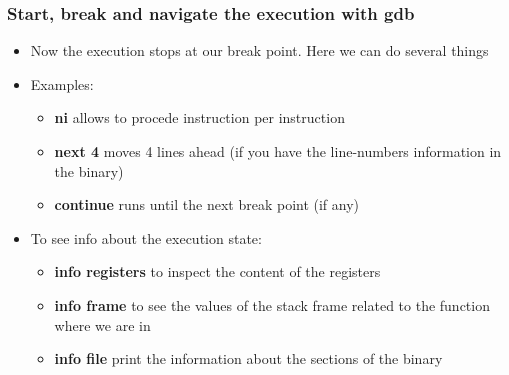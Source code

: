 \documentclass[]{beamer}
\begin{document}
\begin{frame}
  \frametitle{Start, break and navigate the execution with gdb}
  \begin{itemize}
  \item{Now the execution stops at our break point. Here we
      can do several things}
  \item{Examples:}
    \begin{itemize}
    \item{{\bf ni} allows to procede instruction per instruction}
    \item{{\bf next 4} moves 4 lines ahead (if you have the
        line-numbers information in the binary)}
    \item{{\bf continue} runs until the next break point (if any)}
    \end{itemize}
  \item{To see info about the execution state:}
    \begin{itemize}
    \item{{\bf info registers} to inspect the content of the registers}
    \item{{\bf info frame} to see the values of the stack frame
        related to the function where we are in}
    \item{{\bf info file} print the information about the sections of the binary}
    \end{itemize}
  \end{itemize}
\end{frame}
\end{document}
